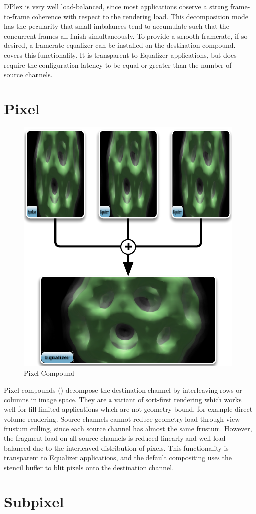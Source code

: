 DPlex is very well load-balanced, since most applications observe a strong
frame-to-frame coherence with respect to the rendering load. This decomposition
mode has the pecularity that small imbalances tend to accumulate such that the
concurrent frames all finish simultaneously. To provide a smooth framerate, if
so desired, a \textsf{framerate equalizer} can be installed on the destination
compound.  covers this functionality. It is transparent to
\textsf{Equalizer} applications, but does require the configuration latency to
be equal or greater than the number of source channels.

\section{Pixel}

\begin{figure}
 \includegraphics[width=.382\textwidth]{images/Pixel}
 {\caption{\label{fPixel}Pixel Compound}}
\end{figure}
Pixel compounds () decompose the destination channel by
interleaving rows or columns in image space. They are a variant of sort-first
rendering which works well for fill-limited applications which are not
geometry bound, for example direct volume rendering. Source channels cannot
reduce geometry load through view frustum culling, since each source channel has
almost the same frustum. However, the fragment load on all source channels is
reduced linearly and well load-balanced due to the interleaved distribution of
pixels. This functionality is transparent to \textsf{Equalizer} applications,
and the default compositing uses the stencil buffer to blit pixels onto the
destination channel.

\section{Subpixel}

